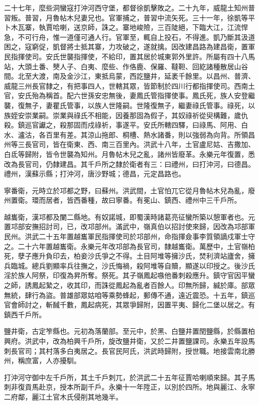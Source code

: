 \begin{pinyinscope}
二十七年，麼些洞蠻寇打沖河西守堡，都督徐凱擊敗之。二十九年，威龍土知州普習叛。普習，月魯帖木兒妻兄也。官軍捕之，普習中流矢死。三十一年，徐凱等平卜木瓦寨，執賈哈喇，送京師，誅之。寨地峻險，三百陡絕，下臨大江，江流悍急，不可行舟，惟一道僅可通人行。官軍至，輒自上投石，不得進。凱乃斷其汲道困之，寇窮促，凱督將士抵其寨，力攻破之，遂就擒。因改建昌路為建昌衛，置軍民指揮使司。安氏世襲指揮使，不給印，置其居於城東郭外里許。所屬有四十八馬站，大頭土番、僰人子、白夷、麼些、作佫鹿、保羅、韃靼、回紇諸種散居山谷間。北至大渡，南及金沙江，東抵烏蒙，西訖鹽井，延袤千餘里。以昌州、普濟、威龍三州長官隸之，有把事四人，世轄其眾，皆節制於四川行都指揮使司。西南土官，安氏殆為稱首。配六世孫安忠無後，妻鳳氏管指揮使事。鳳氏死，族人安登繼襲，復無子，妻瞿氏管事，以族人世隆嗣。世隆復無子，繼妻祿氏管事。祿死，以族姪安崇業嗣。崇業與祿氏不相能，因養那固為假子，其奴祿祈從臾構難，歲仇殺。鎮巡官讞之，殺那固而戍祿祈，事遂平。安氏所轄四驛，曰祿馬、阿用、白水、瀘沽，各百里有差。其涼山拖郎、桐槽、熱水諸番，則以強弱為向背。所領昌州等三長官司，皆在衛東、西、南三百里內。洪武十八年，土官盧尼姑、吉撒加、白氐等歸附，皆令世襲為知州。月魯帖木兒之亂，諸州皆廢革。永樂元年復置，悉改為長官司，仍隸建昌。其千戶所之隸於衛者有三：曰禮州，曰打沖河，曰德昌。禮州，漢蘇示縣；打沖河，唐沙野城；德昌，元定昌路也。

寧番衛，元時立於邛都之野，曰蘇州。洪武間，土官怕兀它從月魯帖木兒為亂，廢州置衛。環而居者，皆西番種，故曰寧番。有冕山、鎮西、禮州中三千戶所。

越巂衛，漢邛都及闌二縣地。有奴諾城，即蜀漢時諸葛亮征蠻所築以憩軍者也。元置邛部安撫招討司，已，改邛部州。滿武中，嶺真伯以招討使來歸，因改為邛部軍民州。洪武二十五年置越巂軍民指揮使司於邛部州，命指揮僉事李質領謫戍軍士守之。二十六年置越巂衛。永樂元年改邛部為長官司，隸越巂衛。萬歷中，土官嶺柏死，孽子應升負印去，柏妾沙氏爭之不得。土目阿堆等擁沙氏，焚利濟站廬舍，擁兵臨城。總兵劉顯率兵往撫之，沙氏悔禍，殺阿堆等自贖，顯遂以印授之。後沙氏淫於族人阿祭，印復為昇所奪。祭死。其子嶺鳳起嗾他番刺殺應升。鎮守官因平蠻之師，誘鳳起縶之，收其印，而誅從鳳起為亂者百餘人。印無所歸，緘於庫。部眾無統，肆行為盜。普雄部眾姑咱等乘勢蜂起，郵傳不通，遠近震恐。十五年，鎮巡官會師討之，斬馘千數，鳳起病死，其眾爭歸附，因置平夷、歸化二堡以居之。有鎮西千戶所。

鹽井衛，古定笮縣也。元初為落蘭部。至元中，於黑、白鹽井置閏鹽縣，於縣置柏興府。洪武中，改為柏興千戶所，旋改鹽井衛，又於二井置鹽課司。永樂五年設馬刺長官司；其村落多白夷居之。長官民阿氏，洪武時歸附，授世職。地接雲南北勝州，稱庶富，人亦擾馴。

打沖河守御中左千戶所，其土千戶刺兀，於洪武二十五年征賈哈喇順來歸。其子馬刺非復貢馬赴京，授本所副千戶。永樂十一年陞正，以別於四所。地與麗江、永寧二府鄰，麗江土官木氏侵削其地幾半。


\end{pinyinscope}
